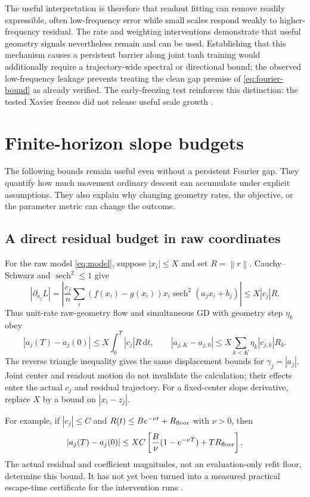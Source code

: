 \documentclass[11pt]{article}
\newcommand{\norm}[1]{\left\lVert#1\right\rVert}
\newcommand{\sech}{\operatorname{sech}}
\newcommand{\dd}{\,\mathrm d}
\begin{document}
The useful interpretation is therefore that readout fitting can remove readily expressible, often low-frequency error while small scales respond weakly to higher-frequency residual. The rate and weighting interventions demonstrate that useful geometry signals nevertheless remain and can be used. Establishing that this mechanism causes a persistent barrier along joint tanh training would additionally require a trajectory-wide spectral or directional bound; the observed low-frequency leakage prevents treating the clean gap premise of \eqref{eq:fourier-bound} as already verified. The early-freezing test reinforces this distinction: the tested Xavier freezes did not release useful scale growth \cite{ledger}.

\section{Finite-horizon slope budgets}

The following bounds remain useful even without a persistent Fourier gap. They quantify how much movement ordinary descent can accumulate under explicit assumptions. They also explain why changing geometry rates, the objective, or the parameter metric can change the outcome.

\subsection{A direct residual budget in raw coordinates}

For the raw model \eqref{eq:model}, suppose $|x_i|\leq X$ and set $R=\norm{r}$. Cauchy--Schwarz and $\sech^2\leq1$ give
\begin{equation}
 \left|\partial_{a_j}L\right|
 =\left|\frac{c_j}{n}\sum_i(f(x_i)-g(x_i))x_i\sech^2(a_jx_i+b_j)\right|
 \leq X|c_j|R.
\end{equation}
Thus unit-rate raw-geometry flow and simultaneous GD with geometry step $\eta_k$ obey
\begin{equation}
 |a_j(T)-a_j(0)|\leq X\int_0^T|c_j|R\dd t,\qquad
 |a_{j,K}-a_{j,0}|\leq X\sum_{k<K}\eta_k|c_{j,k}|R_k.
 \label{eq:direct-budget}
\end{equation}
The reverse triangle inequality gives the same displacement bounds for $\gamma_j=|a_j|$. Joint center and readout motion do not invalidate the calculation; their effects enter the actual $c_j$ and residual trajectory. For a fixed-center slope derivative, replace $X$ by a bound on $|x_i-z_j|$.

For example, if $|c_j|\leq C$ and $R(t)\leq B e^{-\nu t}+R_{\rm floor}$ with $\nu>0$, then
\begin{equation}
 |a_j(T)-a_j(0)|\leq XC\left[\frac{B}{\nu}(1-e^{-\nu T})+TR_{\rm floor}\right].
\end{equation}
The actual residual and coefficient magnitudes, not an evaluation-only refit floor, determine this bound. It has not yet been turned into a measured practical escape-time certificate for the intervention runs \cite{ledger}.
\end{document}
